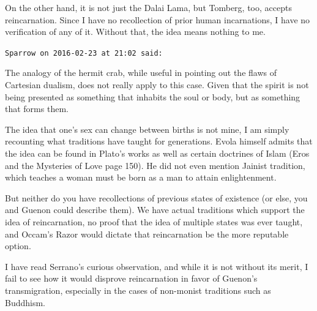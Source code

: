 \begin{footnotesize}
\begin{sffamily}
On the other hand, it is not just the Dalai Lama, but Tomberg, too, accepts reincarnation. Since I have no recollection of prior human incarnations, I have no verification of any of it. Without that, the idea means nothing to me.

\hfill

\texttt{Sparrow on 2016-02-23 at 21:02 said:}

The analogy of the hermit crab, while useful in pointing out the flaws of Cartesian dualism, does not really apply to this case. Given that the spirit is not being presented as something that inhabits the soul or body, but as something that forms them.

The idea that one's sex can change between births is not mine, I am simply recounting what traditions have taught for generations. Evola himself admits that the idea can be found in Plato's works as well as certain doctrines of Islam (Eros and the Mysteries of Love page 150). He did not even mention Jainist tradition, which teaches a woman must be born as a man to attain enlightenment.

But neither do you have recollections of previous states of existence (or else, you and Guenon could describe them). We have actual traditions which support the idea of reincarnation, no proof that the idea of multiple states was ever taught, and Occam's Razor would dictate that reincarnation be the more reputable option.

I have read Serrano's curious observation, and while it is not without its merit, I fail to see how it would disprove reincarnation in favor of Guenon's transmigration, especially in the cases of non-monist traditions such as Buddhism.


\hfill

\end{sffamily}
\end{footnotesize}


